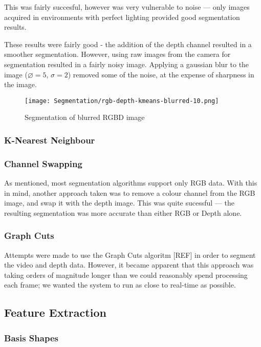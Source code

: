 This was fairly succesful, however was very vulnerable to noise --- only images acquired in environments with perfect lighting provided good segmentation results. 

These results were fairly good - the addition of the depth channel resulted in a smoother segmentation. However, using raw images from the camera for segmentation resulted in a fairly noisy image. Applying a gaussian blur to the image ($\diameter = 5$, $\sigma = 2$) removed some of the noise, at the expense of sharpness in the image.

\begin{figure}[H]
    \centering
    \texttt{[image: Segmentation/rgb-depth-kmeans-blurred-10.png]}
    \caption{Segmentation of blurred RGBD image}
\end{figure}

\subsubsection{K-Nearest Neighbour}

\subsubsection{Channel Swapping}
As mentioned, most segmentation algorithms support only RGB data. With this in mind, another approach taken was to remove a colour channel from the RGB image, and swap it with the depth image. This was quite sucessful --- the resulting segmentation was more accurate than either RGB or Depth alone.

\subsubsection{Graph Cuts}
Attempts were made to use the Graph Cuts algoritm [REF] in order to segment the video and depth data. However, it became apparent that this approach was taking orders of magnitude longer than we could reasonably spend processing each frame; we wanted the system to run as close to real-time as possible.

\subsection{Feature Extraction}

\subsubsection{Basis Shapes}

